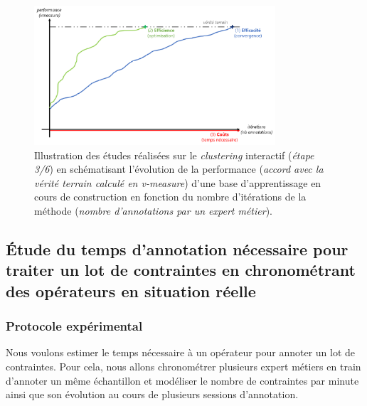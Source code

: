 \begin{tcolorbox}[
		title=\faVial~\textbf{Hypothèse sur les coûts}~\faVial,
		colback=colorTcolorboxHypothesis!15,
		colframe=colorTcolorboxHypothesis!75,
		width=\linewidth
	]
		\begin{figure}[H]  %
			\centering
			\includegraphics[width=0.8\textwidth]{figures/hypotheses-03-couts}
			\caption{Illustration des études réalisées sur le \textit{clustering} interactif (\textit{étape 3/6}) en schématisant l'évolution de la performance (\textit{accord avec la vérité terrain calculé en v-measure}) d'une base d'apprentissage en cours de construction en fonction du nombre d'itérations de la méthode (\textit{nombre d'annotations par un expert métier}).}
			\label{figure:4.3-HYPOTHESE-COUTS}
		\end{figure}

	\end{tcolorbox}
	
	
	\subsection{Étude du temps d'annotation nécessaire pour traiter un lot de contraintes en chronométrant des opérateurs en situation réelle}
	\label{section:4.3.1-ETUDE-COUTS-TEMPS-ANNOTATION}
	
		\subsubsection{Protocole expérimental}
		
			Nous voulons estimer le temps nécessaire à un opérateur pour annoter un lot de contraintes.
			Pour cela, nous allons chronométrer plusieurs expert métiers en train d'annoter un même échantillon et modéliser le nombre de contraintes par minute ainsi que son évolution au cours de plusieurs sessions d'annotation.
			
